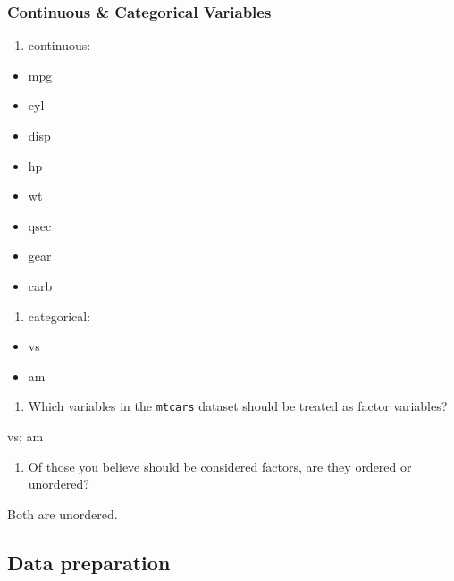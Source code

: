 \documentclass[
  man,
  floatsintext,
  longtable,
  nolmodern,
  notxfonts,
  notimes,
  colorlinks=true,linkcolor=blue,citecolor=blue,urlcolor=blue]{apa7}
\providecommand{\tightlist}{%
  \setlength{\itemsep}{0pt}\setlength{\parskip}{0pt}}
\begin{document}
\subsubsection{Continuous \& Categorical
Variables}\label{continuous-categorical-variables}

\begin{enumerate}
\def\labelenumi{\arabic{enumi}.}
\tightlist
\item
  continuous:
\end{enumerate}

\begin{itemize}
\tightlist
\item
  mpg
\item
  cyl
\item
  disp
\item
  hp
\item
  wt
\item
  qsec
\item
  gear
\item
  carb
\end{itemize}

\begin{enumerate}
\def\labelenumi{\arabic{enumi}.}
\setcounter{enumi}{1}
\tightlist
\item
  categorical:
\end{enumerate}

\begin{itemize}
\tightlist
\item
  vs
\item
  am
\end{itemize}

\begin{enumerate}
\def\labelenumi{\arabic{enumi}.}
\setcounter{enumi}{2}
\tightlist
\item
  Which variables in the \texttt{mtcars} dataset should be treated as
  factor variables?
\end{enumerate}

vs; am

\begin{enumerate}
\def\labelenumi{\arabic{enumi}.}
\setcounter{enumi}{3}
\tightlist
\item
  Of those you believe should be considered factors, are they ordered or
  unordered?
\end{enumerate}

Both are unordered.

\subsection{Data preparation}\label{data-preparation}
\end{document}
